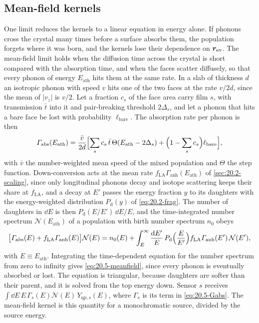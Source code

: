 \subsection{Mean-field kernels}\label{sec:20.5-meanfield}

One limit reduces the kernels to a linear equation in energy alone. If phonons cross the crystal many times before a surface absorbs them, the population forgets where it was born, and the kernels lose their dependence on $\bm{r}_{\mathrm{ev}}$. The mean-field limit holds when the diffusion time across the crystal is short compared with the absorption time, and when the faces scatter diffusely, so that every phonon of energy $E_{\mathrm{ath}}$ hits them at the same rate. In a slab of thickness $d$ an isotropic phonon with speed $v$ hits one of the two faces at the rate $v/2d$, since the mean of $|v_z|$ is $v/2$. Let a fraction $c_s$ of the face area carry film $s$, with transmission $\bar t$ into it and pair-breaking threshold $2\Delta_s$, and let a phonon that hits a bare face be lost with probability $\ell_{\mathrm{bare}}$. The absorption rate per phonon is then
\begin{equation}
  \varGamma_{\mathrm{abs}}(E_{\mathrm{ath}}) = \frac{\bar v}{2d}\Bigl[\sum_s c_s\,\bar t\,\Theta(E_{\mathrm{ath}} - 2\Delta_s) + \Bigl(1 - \sum_s c_s\Bigr)\ell_{\mathrm{bare}}\Bigr] ,
  \label{eq:20.5-Gabs}
\end{equation}
with $\bar v$ the number-weighted mean speed of the mixed population and $\Theta$ the step function. Down-conversion acts at the mean rate $f_{\mathrm{LA}}\varGamma_{\mathrm{anh}}(E_{\mathrm{ath}})$ of \cref{sec:20.2-scaling}, since only longitudinal phonons decay and isotope scattering keeps their share at $f_{\mathrm{LA}}$, and a decay at $E'$ passes the energy fraction $y$ to its daughters with the energy-weighted distribution $P_{\mathrm{d}}(y)$ of \cref{eq:20.2-frag}. The number of daughters in $\dd E$ is then $P_{\mathrm{d}}(E/E')\,\dd E/E$, and the time-integrated number spectrum $\mathcal{N}(E_{\mathrm{ath}})$ of a population with birth number spectrum $n_0$ obeys
\begin{equation}
  \bigl[\varGamma_{\mathrm{abs}}(E) + f_{\mathrm{LA}}\varGamma_{\mathrm{anh}}(E)\bigr]\mathcal{N}(E) = n_0(E) + \int_E^\infty\frac{\mathrm{d} E'}{E}\,P_{\mathrm{d}}\Bigl(\frac{E}{E'}\Bigr)f_{\mathrm{LA}}\varGamma_{\mathrm{anh}}(E')\,\mathcal{N}(E') ,
  \label{eq:20.5-meanfield}
\end{equation}
with $E \equiv E_{\mathrm{ath}}$. Integrating the time-dependent equation for the number spectrum from zero to infinity gives \cref{eq:20.5-meanfield}, since every phonon is eventually absorbed or lost. The equation is triangular, because daughters are softer than their parent, and it is solved from the top energy down. Sensor $s$ receives $\int\dd E\,E\,\varGamma_s(E)\mathcal{N}(E)\,Y_{\mathrm{qp},s}(E)$, where $\varGamma_s$ is its term in \cref{eq:20.5-Gabs}. The mean-field kernel is this quantity for a monochromatic source, divided by the source energy.

